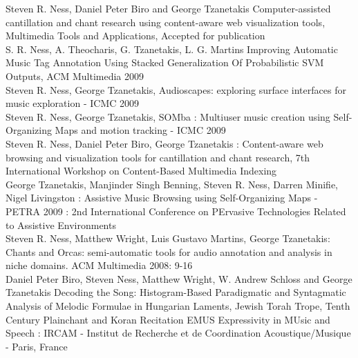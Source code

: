 \documentclass[12pt,oneside]{book}
\begin{document}
Steven R. Ness, Daniel Peter Biro and George Tzanetakis
Computer-assisted cantillation and chant research using content-aware
web visualization tools, Multimedia Tools and Applications, Accepted
for publication
\\

S. R. Ness, A. Theocharis, G. Tzanetakis, L. G. Martins Improving
Automatic Music Tag Annotation Using Stacked Generalization Of
Probabilistic SVM Outputs, ACM Multimedia 2009
\\

Steven R. Ness, George Tzanetakis, Audioscapes: exploring surface
interfaces for music exploration - ICMC 2009
\\

Steven R. Ness, George Tzanetakis, SOMba : Multiuser music creation
using Self-Organizing Maps and motion tracking - ICMC 2009
\\

Steven R. Ness, Daniel Peter Biro, George Tzanetakis : Content-aware
web browsing and visualization tools for cantillation and chant
research, 7th International Workshop on Content-Based Multimedia
Indexing
\\

George Tzanetakis, Manjinder Singh Benning, Steven R. Ness, Darren
Minifie, Nigel Livingston : Assistive Music Browsing using
Self-Organizing Maps - PETRA 2009 : 2nd International Conference on
PErvasive Technologies Related to Assistive Environments
\\

Steven R. Ness, Matthew Wright, Luis Gustavo Martins, George
Tzanetakis: Chants and Orcas: semi-automatic tools for audio
annotation and analysis in niche domains. ACM Multimedia 2008: 9-16
\\

Daniel Peter Biro, Steven Ness, Matthew Wright, W. Andrew Schloss and
George Tzanetakis Decoding the Song: Histogram-Based Paradigmatic and
Syntagmatic Analysis of Melodic Formulae in Hungarian Laments, Jewish
Torah Trope, Tenth Century Plainchant and Koran Recitation EMUS
Expressivity in MUsic and Speech : IRCAM - Institut de Recherche et de
Coordination Acoustique/Musique - Paris, France
\\




\end{document}
